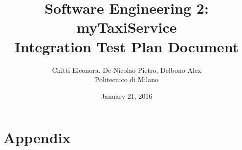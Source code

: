 \documentclass[12pt, a4paper]{report}
\begin{document}
\title{Software Engineering 2: myTaxiService \\ \vspace{1em} Integration Test Plan Document}
\author{Chitti Eleonora, De Nicolao Pietro, Delbono Alex\\
Politecnico di Milano}
\date{January 21, 2016}
\maketitle
\tableofcontents











\appendix
\chapter{Appendix}




\end{document}

